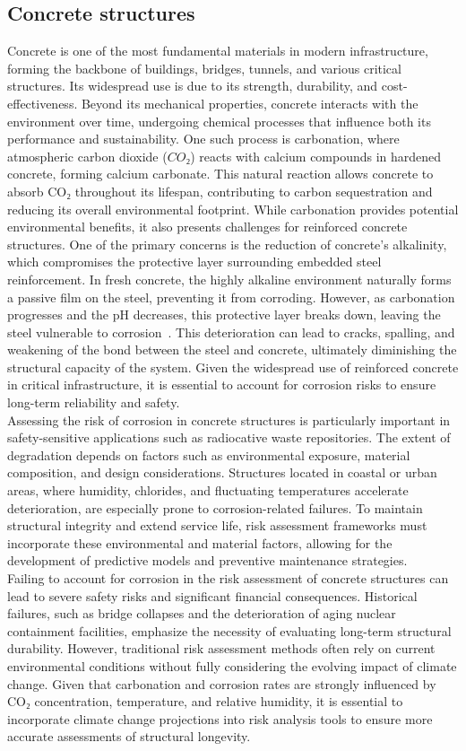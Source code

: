 \subsection{Concrete structures}
Concrete is one of the most fundamental materials in modern infrastructure, forming the backbone of buildings, bridges, tunnels, and various critical structures.
Its widespread use is due to its strength, durability, and cost-effectiveness.
Beyond its mechanical properties, concrete interacts with the environment over time, undergoing chemical processes that influence both its performance and sustainability. 
One such process is carbonation, where atmospheric carbon dioxide ($CO₂$) reacts with calcium compounds in hardened concrete, forming calcium carbonate.
This natural reaction allows concrete to absorb CO₂ throughout its lifespan, contributing to carbon sequestration and reducing its overall environmental footprint. While carbonation provides potential environmental benefits, it also presents challenges for reinforced concrete structures. One of the primary concerns is the reduction of concrete’s alkalinity, which compromises the protective layer surrounding embedded steel reinforcement. In fresh concrete, the highly alkaline environment naturally forms a passive film on the steel, preventing it from corroding.
However, as carbonation progresses and the pH decreases, this protective layer breaks down, leaving the steel vulnerable to corrosion~\cite{carbonation}.
This deterioration can lead to cracks, spalling, and weakening of the bond between the steel and concrete, ultimately diminishing the structural capacity of the system. Given the widespread use of reinforced concrete in critical infrastructure, it is essential to account for corrosion risks to ensure long-term reliability and safety. \\
Assessing the risk of corrosion in concrete structures is particularly important in safety-sensitive applications such as radiocative waste repositories. The extent of degradation depends on factors such as environmental exposure, material composition, and design considerations. Structures located in coastal or urban areas, where humidity, chlorides, and fluctuating temperatures accelerate deterioration, are especially prone to corrosion-related failures. To maintain structural integrity and extend service life, risk assessment frameworks must incorporate these environmental and material factors, allowing for the development of predictive models and preventive maintenance strategies. \\
Failing to account for corrosion in the risk assessment of concrete structures can lead to severe safety risks and significant financial consequences. Historical failures, such as bridge collapses and the deterioration of aging nuclear containment facilities, emphasize the necessity of evaluating long-term structural durability. However, traditional risk assessment methods often rely on current environmental conditions without fully considering the evolving impact of climate change. Given that carbonation and corrosion rates are strongly influenced by CO₂ concentration, temperature, and relative humidity, it is essential to incorporate climate change projections into risk analysis tools to ensure more accurate assessments of structural longevity.
